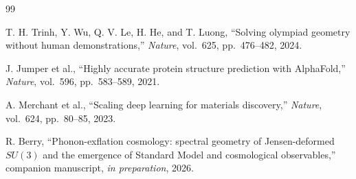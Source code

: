 \documentclass[12pt,a4paper]{article}
\begin{document}
\begin{thebibliography}{99}

    T. H. Trinh, Y. Wu, Q. V. Le, H. He, and T. Luong, ``Solving olympiad geometry without human demonstrations,'' \emph{Nature}, vol.~625, pp.~476--482, 2024.

    J. Jumper et al., ``Highly accurate protein structure prediction with AlphaFold,'' \emph{Nature}, vol.~596, pp.~583--589, 2021.

    A. Merchant et al., ``Scaling deep learning for materials discovery,'' \emph{Nature}, vol.~624, pp.~80--85, 2023.

    R. Berry, ``Phonon-exflation cosmology: spectral geometry of Jensen-deformed $SU(3)$ and the emergence of Standard Model and cosmological observables,'' companion manuscript, \emph{in preparation}, 2026.

\end{thebibliography}
\end{document}
